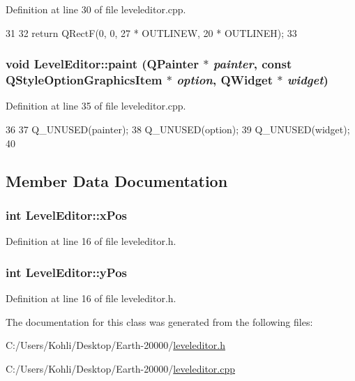 Definition at line 30 of file leveleditor.cpp.


\begin{DoxyCode}
31 {
32     return QRectF(0, 0, 27 * OUTLINEW, 20 * OUTLINEH);
33 }
\end{DoxyCode}
\hypertarget{class_level_editor_a95f1903a2fbfd21e3fa60038d8248779}{
\subsubsection[{paint}]{\setlength{\rightskip}{0pt plus 5cm}void LevelEditor::paint (QPainter $\ast$ {\em painter}, \/  const QStyleOptionGraphicsItem $\ast$ {\em option}, \/  QWidget $\ast$ {\em widget})}}
\label{class_level_editor_a95f1903a2fbfd21e3fa60038d8248779}


Definition at line 35 of file leveleditor.cpp.


\begin{DoxyCode}
36 {
37     Q_UNUSED(painter);
38     Q_UNUSED(option);
39     Q_UNUSED(widget);
40 }
\end{DoxyCode}


\subsection{Member Data Documentation}
\hypertarget{class_level_editor_a39baf685b6e94984721a0df846316bdf}{
\subsubsection[{xPos}]{\setlength{\rightskip}{0pt plus 5cm}int {\bf LevelEditor::xPos}}}
\label{class_level_editor_a39baf685b6e94984721a0df846316bdf}


Definition at line 16 of file leveleditor.h.\hypertarget{class_level_editor_a0d9ec2020a126ae5bdee4f442e1dd628}{
\subsubsection[{yPos}]{\setlength{\rightskip}{0pt plus 5cm}int {\bf LevelEditor::yPos}}}
\label{class_level_editor_a0d9ec2020a126ae5bdee4f442e1dd628}


Definition at line 16 of file leveleditor.h.

The documentation for this class was generated from the following files:\begin{DoxyCompactItemize}
\item 
C:/Users/Kohli/Desktop/Earth-\/20000/\hyperlink{leveleditor_8h}{leveleditor.h}\item 
C:/Users/Kohli/Desktop/Earth-\/20000/\hyperlink{leveleditor_8cpp}{leveleditor.cpp}\end{DoxyCompactItemize}
